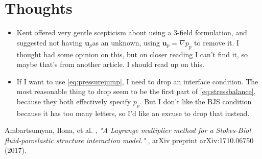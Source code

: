 \documentclass{article}
\newcommand{\grad}{\ensuremath{\nabla}}
\newcommand{\up}{\ensuremath{\mathbf{u}_p}}
\newcommand{\pp}{\ensuremath{p_p}}
\begin{document}
\section{Thoughts}
\begin{itemize}
\item Kent offered very gentle scepticism about using a 3-field formulation, and suggested not having \up as an unknown, using $\up = \grad \pp$ to remove it. I thought \cite{ambartsumyan} had some opinion on this, but on closer reading I can't find it, so maybe that's from another article. I should read up on this.
\item If I want to use \ref{eq:pressurejump}, I need to drop an interface condition. The most reasonable thing to drop seem to be the first part of \ref{eq:stressbalance}, because they both effectively specify \pp. But I don't like the BJS condition because it has too many letters, so I'd like an excuse to drop that instead.
  
 
\end{itemize}



\begin{thebibliography}{99}
{\sc Ambartsumyan, Ilona, et al. }, {\em "A Lagrange multiplier method for a Stokes-Biot fluid-poroelastic structure interaction model." }, arXiv preprint arXiv:1710.06750 (2017).
  
\end{thebibliography}
\end{document}
